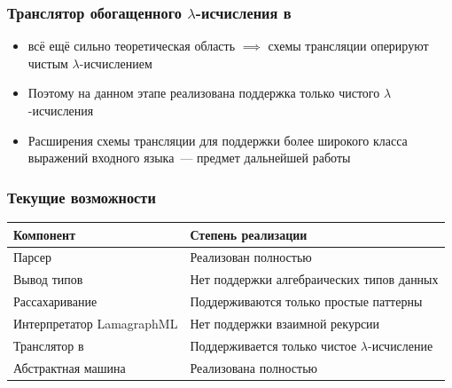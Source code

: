 \documentclass
  [ russian
  , aspectratio=169 %
  ] {beamer}
\begin{document}
\begin{frame}
    \frametitle{Транслятор обогащенного $\lambda$-исчисления в \INs{}}

    \begin{itemize}
        \item \INs{} всё ещё сильно теоретическая область $\implies$ схемы трансляции оперируют чистым $\lambda$-исчислением
        \item Поэтому на данном этапе реализована поддержка только чистого $\lambda$-исчисления
        \item Расширения схемы трансляции для поддержки более широкого класса выражений входного языка~--- предмет дальнейшей работы
    \end{itemize}

\end{frame}

\begin{frame}
    \frametitle{Текущие возможности}

    \begin{center}
        \begin{tabular}{ll}
            \toprule
            Компонент                 & Степень реализации                                \\
            \midrule
            Парсер                    & Реализован полностью                              \\
            Вывод типов               & Нет поддержки алгебраических типов данных         \\
            Рассахаривание            & Поддерживаются только простые паттерны            \\
            Интерпретатор LamagraphML & Нет поддержки взаимной рекурсии                   \\
            Транслятор в \INs{}       & Поддерживается только чистое $\lambda$-исчисление \\
            Абстрактная машина        & Реализована полностью                             \\
            \bottomrule
        \end{tabular}
    \end{center}

\end{frame}
\end{document}

